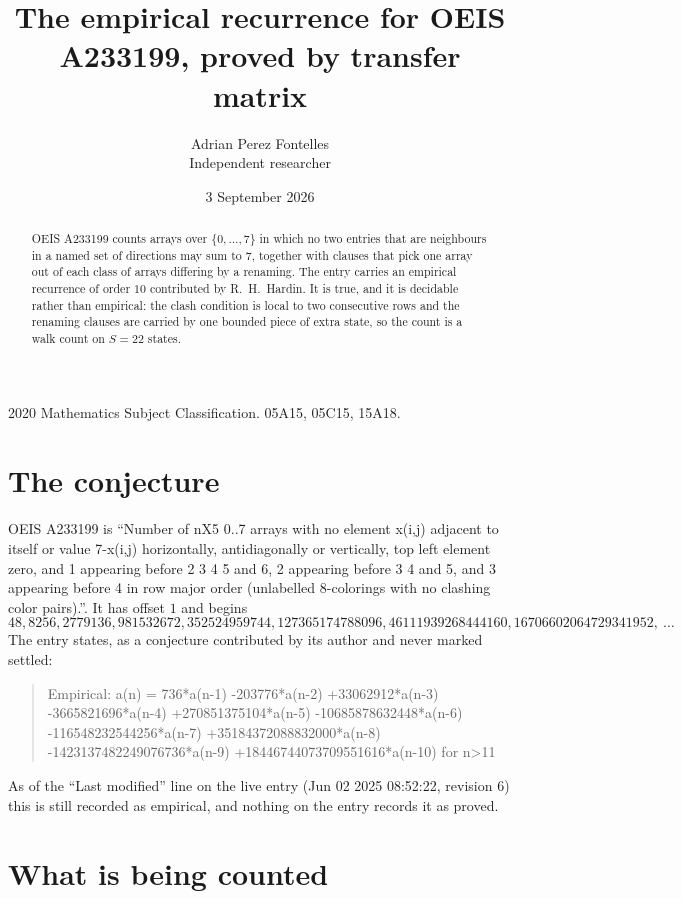 \documentclass[11pt,a4paper]{article}
\title{The empirical recurrence for OEIS A233199, proved by transfer matrix}
\author{Adrian Perez Fontelles\\ \small Independent researcher}
\date{3 September 2026}
\theoremstyle{plain}
\theoremstyle{definition}
\begin{document}
\maketitle

\begin{abstract}
OEIS A233199 counts arrays over $\{0,\dots,7\}$ in which no two entries that are neighbours in
a named set of directions may sum to $7$, together with clauses that pick one array out of
each class of arrays differing by a renaming. The entry carries an empirical recurrence of
order $10$ contributed by R.~H.~Hardin. It is true, and it is decidable rather than
empirical: the clash condition is local to two consecutive rows and the renaming clauses are
carried by one bounded piece of extra state, so the count is a walk count on $S=22$ states.
\end{abstract}

\noindent\small 2020 Mathematics Subject Classification. 05A15, 05C15, 15A18.\normalsize

\section{The conjecture}

OEIS A233199 is ``Number of nX5 0..7 arrays with no element x(i,j) adjacent to itself or value 7-x(i,j) horizontally, antidiagonally or vertically, top left element zero, and 1 appearing before 2 3 4 5 and 6, 2 appearing before 3 4 and 5, and 3 appearing before 4 in row major order (unlabelled 8-colorings with no clashing color pairs).''. It has offset $1$ and begins
\[
48, 8256, 2779136, 981532672, 352524959744, 127365174788096, 46111939268444160, 16706602064729341952,\ \dots
\]
The entry states, as a conjecture contributed by its author and never marked settled:
\begin{quote}
Empirical: a(n) = 736*a(n-1) -203776*a(n-2) +33062912*a(n-3) -3665821696*a(n-4) +270851375104*a(n-5) -10685878632448*a(n-6) -116548232544256*a(n-7) +35184372088832000*a(n-8) -1423137482249076736*a(n-9) +18446744073709551616*a(n-10) for n>11
\end{quote}
As of the ``Last modified'' line on the live entry (Jun 02 2025 08:52:22, revision 6) this is still
recorded as empirical, and nothing on the entry records it as proved.

\section{What is being counted}
\end{document}
